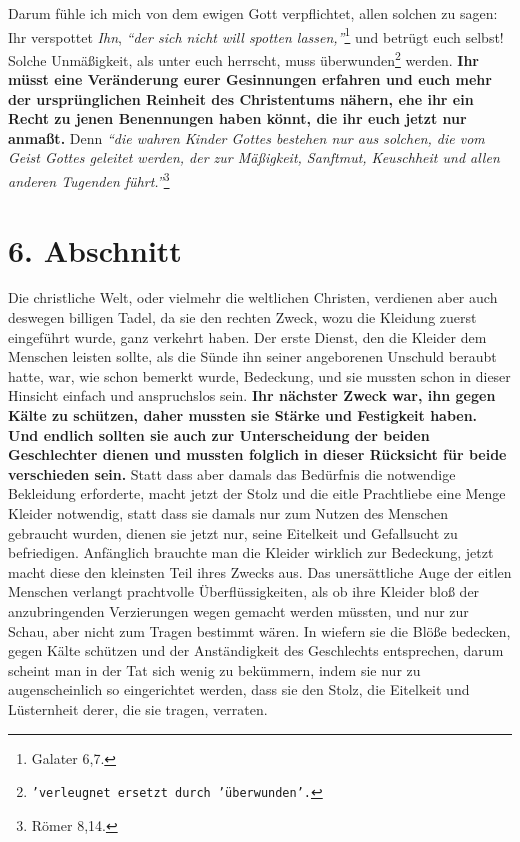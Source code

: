 \medskip

Darum fühle ich mich von dem ewigen Gott verpflichtet, allen solchen zu sagen:
Ihr verspottet \textit{Ihn},
\textit{"`der sich nicht will spotten lassen,"'}\footnote{Galater 6,7.}
und betrügt euch selbst! Solche Unmäßigkeit, als unter
euch herrscht, muss
überwunden\footnote{\texttt{'verleugnet ersetzt durch 'überwunden'.}} werden.
\label{ref:14_06_wahre_nachfolger_umkehr}
\textbf{Ihr müsst eine Veränderung eurer Gesinnungen erfahren und euch
mehr der ursprünglichen Reinheit des Christentums nähern, ehe ihr ein Recht zu
jenen Benennungen haben könnt, die ihr euch jetzt nur anmaßt.}
 Denn
\textit{"`die wahren
Kinder Gottes bestehen nur aus solchen, die vom Geist Gottes geleitet werden,
der zur Mäßigkeit, Sanftmut, Keuschheit und allen anderen Tugenden
führt."'}\footnote{Römer 8,14.}

\section{6. Abschnitt} \label{kap14_ab6}

Die christliche Welt, oder vielmehr die weltlichen
Christen,
verdienen aber auch
deswegen billigen Tadel, da sie den rechten Zweck, wozu die Kleidung zuerst
eingeführt wurde, ganz verkehrt haben. Der erste Dienst, den die Kleider dem
Menschen leisten sollte, als die Sünde ihn seiner angeborenen Unschuld beraubt
hatte, war, wie schon bemerkt wurde, Bedeckung, und sie mussten schon in dieser
Hinsicht einfach und anspruchslos sein. \textbf{Ihr nächster Zweck war, ihn
gegen Kälte
zu schützen, daher mussten sie Stärke und Festigkeit haben. Und endlich sollten
sie auch zur Unterscheidung der beiden Geschlechter dienen und mussten folglich
in dieser Rücksicht für beide verschieden sein.} Statt dass aber
damals das
Bedürfnis die notwendige Bekleidung erforderte, macht jetzt der Stolz und die
eitle Prachtliebe eine Menge Kleider notwendig, statt dass sie damals nur zum
Nutzen des Menschen gebraucht wurden, dienen sie jetzt nur, seine
Eitelkeit und
Gefallsucht zu befriedigen. Anfänglich brauchte man die Kleider wirklich zur
Bedeckung, jetzt macht diese den kleinsten Teil ihres Zwecks aus. Das
unersättliche Auge der eitlen Menschen verlangt prachtvolle Überflüssigkeiten,
als ob ihre Kleider bloß der anzubringenden Verzierungen wegen gemacht werden
müssten, und nur zur Schau, aber nicht zum Tragen bestimmt wären. In wiefern sie
die Blöße bedecken, gegen Kälte schützen und der Anständigkeit des Geschlechts
entsprechen, darum scheint man in der Tat sich wenig zu bekümmern, indem
sie nur zu augenscheinlich so eingerichtet werden, dass sie den Stolz, die
Eitelkeit und Lüsternheit derer, die sie tragen, verraten.

